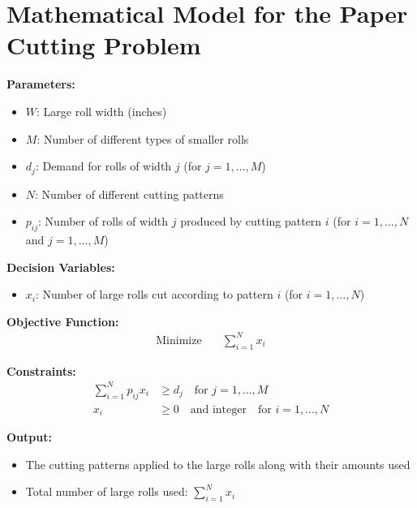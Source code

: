 \documentclass{article}
\begin{document}
\section*{Mathematical Model for the Paper Cutting Problem}

\textbf{Parameters:}
\begin{itemize}
    \item \( W \): Large roll width (inches) 
    \item \( M \): Number of different types of smaller rolls 
    \item \( d_j \): Demand for rolls of width \( j \) (for \( j = 1, \ldots, M \)) 
    \item \( N \): Number of different cutting patterns 
    \item \( p_{ij} \): Number of rolls of width \( j \) produced by cutting pattern \( i \) (for \( i = 1, \ldots, N \) and \( j = 1, \ldots, M \))
\end{itemize}

\textbf{Decision Variables:}
\begin{itemize}
    \item \( x_i \): Number of large rolls cut according to pattern \( i \) (for \( i = 1, \ldots, N \))
\end{itemize}

\textbf{Objective Function:}
\begin{align*}
    \text{Minimize} \quad & \sum_{i=1}^{N} x_i
\end{align*}

\textbf{Constraints:}
\begin{align*}
    \sum_{i=1}^{N} p_{ij} x_i & \geq d_j \quad \text{for } j = 1, \ldots, M \\
    x_i & \geq 0 \quad \text{and integer} \quad \text{for } i = 1, \ldots, N 
\end{align*}

\textbf{Output:}
\begin{itemize}
    \item The cutting patterns applied to the large rolls along with their amounts used 
    \item Total number of large rolls used: \( \sum_{i=1}^{N} x_i \)
\end{itemize}
\end{document}

